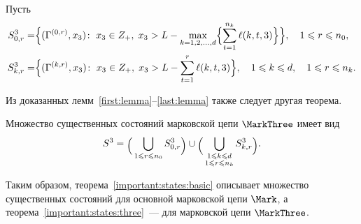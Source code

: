 Пусть
\begin{align*}
  S^3_{0, r} = & 
  \Bigl\{
  (\Gamma^{(0,  r)},  x_3) \colon \; x_3\in Z_+, \; x_3 > L - \max\limits_{k=1,  2, 
    \ldots,  d}
  \Bigl\{ \sum_{t=1}^{n_k} \ell({k,  t,  3}) \Bigl\}\Bigl\},  
  \quad 1 \leqslant r \leqslant n_0,  \\
  S^3_{k,  r} = & 
  \Bigl\{
  (\Gamma^{(k,  r)},  x_3) \colon \; x_3\in Z_+, \; x_3 > L - \sum_{t=1}^{r} \ell({k,  t,  3})
  \Bigr\},  
  \quad 1 \leqslant k \leqslant d,  \quad 1 \leqslant r \leqslant n_k.
\end{align*}


Из доказанных лемм~\ref{first:lemma}--\ref{last:lemma} также следует другая теорема.
\begin{theorem}
Множество существенных состояний марковской цепи $\MarkThree$ имеет вид
\begin{equation}
S^{3} = \raisebox{-.5ex}{$\Bigl($}\bigcup\limits_{1 \leqslant r \leqslant n_0}S^3_{0, r}\raisebox{-.5ex}{$\Bigr)$}\cup \raisebox{-.5ex}{$\Bigl($}\bigcup\limits_{\substack{1 \leqslant k \leqslant d\\ 1 \leqslant r \leqslant n_k}} S^3_{k, r}\raisebox{-.5ex}{$\Bigr)$}.
\label{important:states:three:expr}
\end{equation}
\label{important:states:three}
\end{theorem}

Таким образом, теорема~\ref{important:states:basic} описывает множество существенных состояний для основной марковской цепи $\Mark$, а теорема~\ref{important:states:three}~--- для марковской цепи $\MarkThree$. 




